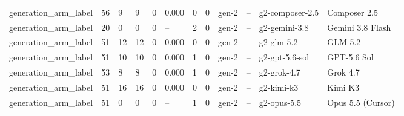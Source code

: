 \begin{tabular}{llllllllllll}
generation\_arm\_label & 56 & 9 & 9 & 0 & 0.000 & 0 & 0 & gen-2 & -- & g2-composer-2.5 & Composer 2.5 \\
generation\_arm\_label & 20 & 0 & 0 & 0 & -- & 2 & 0 & gen-2 & -- & g2-gemini-3.8 & Gemini 3.8 Flash \\
generation\_arm\_label & 51 & 12 & 12 & 0 & 0.000 & 0 & 0 & gen-2 & -- & g2-glm-5.2 & GLM 5.2 \\
generation\_arm\_label & 51 & 10 & 10 & 0 & 0.000 & 1 & 0 & gen-2 & -- & g2-gpt-5.6-sol & GPT-5.6 Sol \\
generation\_arm\_label & 53 & 8 & 8 & 0 & 0.000 & 1 & 0 & gen-2 & -- & g2-grok-4.7 & Grok 4.7 \\
generation\_arm\_label & 51 & 16 & 16 & 0 & 0.000 & 0 & 0 & gen-2 & -- & g2-kimi-k3 & Kimi K3 \\
generation\_arm\_label & 51 & 0 & 0 & 0 & -- & 1 & 0 & gen-2 & -- & g2-opus-5.5 & Opus 5.5 (Cursor) \\
\bottomrule
\end{tabular}
